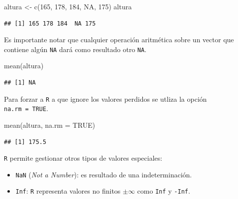 \documentclass[
]{book}
\newenvironment{Shaded}{\begin{snugshade}}{\end{snugshade}}
\newcommand{\AttributeTok}[1]{\textcolor[rgb]{0.77,0.63,0.00}{#1}}
\newcommand{\ConstantTok}[1]{\textcolor[rgb]{0.00,0.00,0.00}{#1}}
\newcommand{\DecValTok}[1]{\textcolor[rgb]{0.00,0.00,0.81}{#1}}
\newcommand{\FunctionTok}[1]{\textcolor[rgb]{0.00,0.00,0.00}{#1}}
\newcommand{\NormalTok}[1]{#1}
\newcommand{\OtherTok}[1]{\textcolor[rgb]{0.56,0.35,0.01}{#1}}
\theoremstyle{break}
\begin{document}
\begin{Shaded}
\begin{Highlighting}[]
\NormalTok{altura }\OtherTok{\textless{}{-}} \FunctionTok{c}\NormalTok{(}\DecValTok{165}\NormalTok{, }\DecValTok{178}\NormalTok{, }\DecValTok{184}\NormalTok{, }\ConstantTok{NA}\NormalTok{, }\DecValTok{175}\NormalTok{)}
\NormalTok{altura}
\end{Highlighting}
\end{Shaded}

\begin{verbatim}
## [1] 165 178 184  NA 175
\end{verbatim}

Es importante notar que cualquier operación aritmética sobre un vector
que contiene algún \texttt{NA} dará como resultado otro \texttt{NA}.

\begin{Shaded}
\begin{Highlighting}[]
\FunctionTok{mean}\NormalTok{(altura)}
\end{Highlighting}
\end{Shaded}

\begin{verbatim}
## [1] NA
\end{verbatim}

Para forzar a \texttt{R} a que ignore los valores perdidos se utliza la opción \texttt{na.rm\ =\ TRUE}.

\begin{Shaded}
\begin{Highlighting}[]
\FunctionTok{mean}\NormalTok{(altura, }\AttributeTok{na.rm =} \ConstantTok{TRUE}\NormalTok{)}
\end{Highlighting}
\end{Shaded}

\begin{verbatim}
## [1] 175.5
\end{verbatim}

\texttt{R} permite gestionar otros tipos de valores especiales:

\begin{itemize}
\item
  \texttt{NaN} (\emph{Not a Number}): es resultado de una indeterminación.
\item
  \texttt{Inf}: \texttt{R} representa valores no finitos \(\pm \infty\) como \texttt{Inf} y \texttt{-Inf}.
\end{itemize}

\vspace*{0.3cm}
\end{document}
